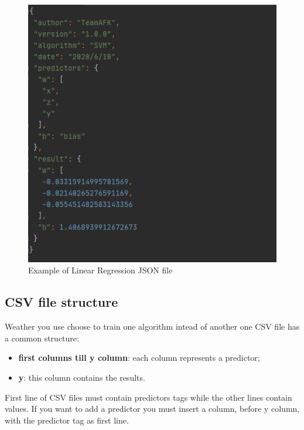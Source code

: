 		\begin{figure}[H]
		\centering
		\includegraphics[scale=0.70]{../Developer_manual/img/support_vector_machine_json.JPG}
		\caption{Example of Linear Regression JSON file}
	\end{figure}	
		
	
	\subsection{CSV file structure}
Weather you use choose to train one algorithm intead of another one CSV file has a common structure:
	\begin{itemize}
		\item\textbf{first columns till y column}: each column represents a predictor;
		\item\textbf{y}: this column contains the results.	
	\end{itemize}	 

First line of CSV files must contain predictors tags while the other lines contain values. If you want to add a predictor you must insert a column, before y column, with the predictor tag as first line.

